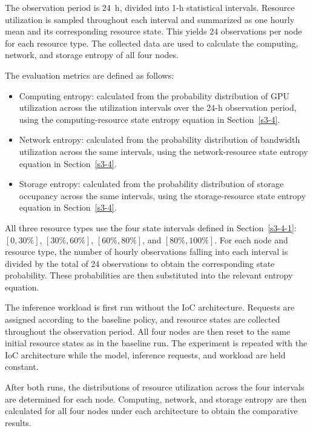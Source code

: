 \documentclass{ccjnl}
\begin{document}
The observation period is 24~h, divided into 1-h statistical intervals. Resource utilization is sampled throughout each interval and summarized as one hourly mean and its corresponding resource state. This yields 24 observations per node for each resource type. The collected data are used to calculate the computing, network, and storage entropy of all four nodes.

The evaluation metrics are defined as follows:
\begin{itemize}[nosep]
	\item Computing entropy: calculated from the probability distribution of GPU utilization across the utilization intervals over the 24-h observation period, using the computing-resource state entropy equation in Section~\ref{s3-4}.
	
	\item Network entropy: calculated from the probability distribution of bandwidth utilization across the same intervals, using the network-resource state entropy equation in Section~\ref{s3-4}.
	
	\item Storage entropy: calculated from the probability distribution of storage occupancy across the same intervals, using the storage-resource state entropy equation in Section~\ref{s3-4}.
\end{itemize}

All three resource types use the four state intervals defined in Section~\ref{s3-4-1}: $[0,30\%]$, $[30\%,60\%]$, $[60\%,80\%]$, and $[80\%,100\%]$. For each node and resource type, the number of hourly observations falling into each interval is divided by the total of 24 observations to obtain the corresponding state probability. These probabilities are then substituted into the relevant entropy equation.

The inference workload is first run without the IoC architecture. Requests are assigned according to the baseline policy, and resource states are collected throughout the observation period. All four nodes are then reset to the same initial resource states as in the baseline run. The experiment is repeated with the IoC architecture while the model, inference requests, and workload are held constant.

After both runs, the distributions of resource utilization across the four intervals are determined for each node. Computing, network, and storage entropy are then calculated for all four nodes under each architecture to obtain the comparative results.
\end{document}
